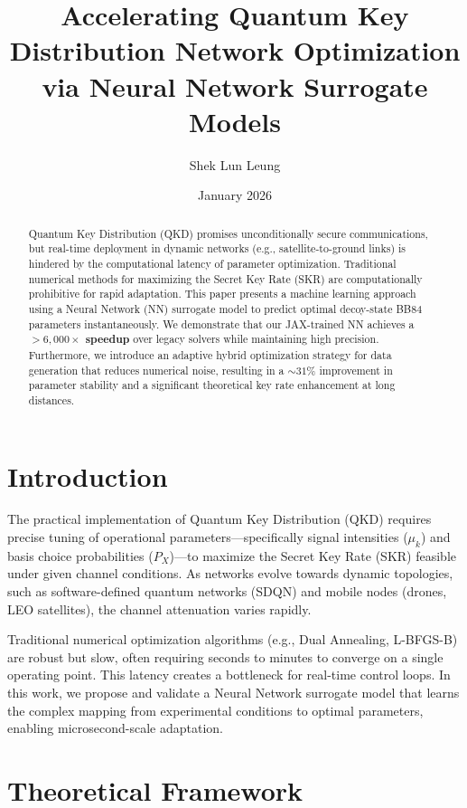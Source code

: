 \documentclass[11pt,a4paper]{article}
\title{Accelerating Quantum Key Distribution Network Optimization via Neural Network Surrogate Models}
\author{Shek Lun Leung}
\date{January 2026}
\begin{document}
\maketitle

\begin{abstract}
Quantum Key Distribution (QKD) promises unconditionally secure communications, but real-time deployment in dynamic networks (e.g., satellite-to-ground links) is hindered by the computational latency of parameter optimization. Traditional numerical methods for maximizing the Secret Key Rate (SKR) are computationally prohibitive for rapid adaptation. This paper presents a machine learning approach using a Neural Network (NN) surrogate model to predict optimal decoy-state BB84 parameters instantaneously. We demonstrate that our JAX-trained NN achieves a \textbf{$>6,000\times$ speedup} over legacy solvers while maintaining high precision. Furthermore, we introduce an adaptive hybrid optimization strategy for data generation that reduces numerical noise, resulting in a $\sim 31\%$ improvement in parameter stability and a significant theoretical key rate enhancement at long distances.
\end{abstract}

\section{Introduction}
The practical implementation of Quantum Key Distribution (QKD) requires precise tuning of operational parameters—specifically signal intensities ($\mu_k$) and basis choice probabilities ($P_X$)—to maximize the Secret Key Rate (SKR) feasible under given channel conditions. As networks evolve towards dynamic topologies, such as software-defined quantum networks (SDQN) and mobile nodes (drones, LEO satellites), the channel attenuation varies rapidly.

Traditional numerical optimization algorithms (e.g., Dual Annealing, L-BFGS-B) are robust but slow, often requiring seconds to minutes to converge on a single operating point. This latency creates a bottleneck for real-time control loops. In this work, we propose and validate a Neural Network surrogate model that learns the complex mapping from experimental conditions to optimal parameters, enabling microsecond-scale adaptation.

\section{Theoretical Framework}
\end{document}
